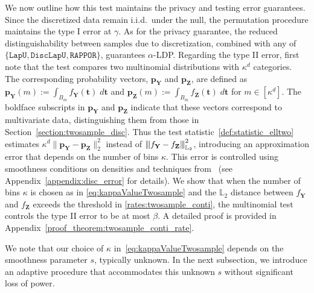 \documentclass[twoside,11pt]{article}
\newcommand{\Ell}{\mathbb{L}}
\newcommand{\EllTwo}{\Ell_2} %
\newcommand{\normEllp}[3]{
	\vertiii{#1}_{\Ell_{#2}}^{#3}
}
\newcommand{\vertiii}[1]{
	{\left\vert\kern-0.25ex\left\vert\kern-0.25ex\left\vert #1 
		\right\vert\kern-0.25ex\right\vert\kern-0.25ex\right\vert}
}%
\newcommand{\rvTwo}{Y}
\newcommand{\rvThree}{Z}
\newcommand{\vectorize}[1]{\mathbf{#1}}
\newcommand{\dimDensity}{d} %
\newcommand{\vectorIndex}{m}
\newcommand{\probVec}{\mathbf{p}} %
\newcommand{\smoothness}{s}
\newcommand{\privacyParameter}{\alpha} %
\newcommand{\binNum}{\kappa}           %
\begin{document}
We now outline how this test maintains the privacy and testing error guarantees.
Since the discretized data remain i.i.d.~under the null, the permutation procedure maintains the type I error at $\gamma$.
As for the privacy guarantee, the reduced distinguishability between samples due to discretization, combined with any of $\{\texttt{LapU},\texttt{DiscLapU},\texttt{RAPPOR}\}$, guarantees $\privacyParameter$-LDP.
Regarding the type II error, first note that the test compares two multinomial distributions with $\binNum^\dimDensity$ categories. The corresponding probability vectors, $\probVec_{\mathbf{\rvTwo}}$ and $\probVec_{\mathbf{\rvThree}}$, are defined as 
$\probVec_{\mathbf{\rvTwo}}(\vectorIndex) :=
\int_{B_\vectorIndex}
f_{\vectorize{Y}}(\vectorize{t})
\;
d\vectorize{t}$
and
$\probVec_{\mathbf{\rvThree}}(\vectorIndex)
:=
\int_{B_\vectorIndex} 
f_{\mathbf{\rvThree}}
(\vectorize{t})
\;
d\vectorize{t}$
for $\vectorIndex \in [\binNum^\dimDensity]$.
The boldface subscripts in $\probVec_{\mathbf{\rvTwo}}$ and $\probVec_{\mathbf{\rvThree}}$ indicate that these vectors correspond to multivariate data, distinguishing them from those in Section~\ref{section:twosample_disc}. Thus the test statistic~\eqref{def:statistic_elltwo} estimates
$
\binNum^{\dimDensity}
\|
\probVec_{\vectorize{\rvTwo}} - \probVec_{\vectorize{\rvThree}}
\|_2^2$ instead of $\normEllp{ f_{\vectorize{Y}} - f_{\vectorize{Z}} }{2}{2}$, introducing an approximation error that depends on the number of bins $\binNum$.  This error is controlled using smoothness conditions on densities and techniques from \citep{Arias-Castro2018RememberDimension,Lam-Weil2021MinimaxConstraint}~(see Appendix~\ref{appendix:disc_error} for details). We show that when the number of bins $\binNum$ is chosen as in \eqref{eq:kappaValueTwosample} and the $\EllTwo$ distance between $f_{\vectorize{Y}}$ and $f_{\vectorize{Z}}$ exceeds the threshold in \eqref{rates:twosample_conti}, the multinomial test controls the type II error to be at most $\beta$. A detailed proof is provided in Appendix~\ref{proof_theorem:twosample_conti_rate}. 

We note that our choice of $\binNum$ in~\eqref{eq:kappaValueTwosample} depends on the smoothness parameter $\smoothness$, typically unknown. In the next subsection, we introduce an adaptive procedure that accommodates this unknown $\smoothness$ without significant loss of power.
\end{document}
